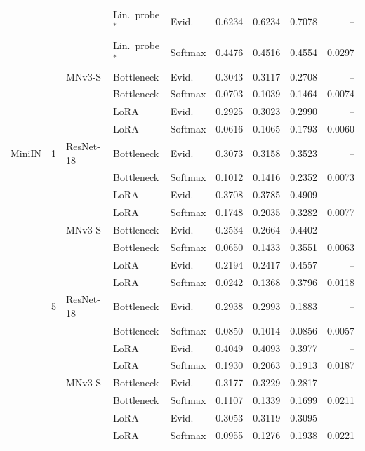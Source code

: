 \begin{longtable}{@{}lllllrrrr@{}}
 &  &  & Lin.\ probe$^\ast$ & Evid. & 0.6234 & 0.6234 & 0.7078 & -- \\
 &  &  & Lin.\ probe$^\ast$ & Softmax & 0.4476 & 0.4516 & 0.4554 & 0.0297 \\
 &  & MNv3-S & Bottleneck & Evid. & 0.3043 & 0.3117 & 0.2708 & -- \\
 &  &  & Bottleneck & Softmax & 0.0703 & 0.1039 & 0.1464 & 0.0074 \\
 &  &  & LoRA & Evid. & 0.2925 & 0.3023 & 0.2990 & -- \\
 &  &  & LoRA & Softmax & 0.0616 & 0.1065 & 0.1793 & 0.0060 \\
MiniIN & 1 & ResNet-18 & Bottleneck & Evid. & 0.3073 & 0.3158 & 0.3523 & -- \\
 &  &  & Bottleneck & Softmax & 0.1012 & 0.1416 & 0.2352 & 0.0073 \\
 &  &  & LoRA & Evid. & 0.3708 & 0.3785 & 0.4909 & -- \\
 &  &  & LoRA & Softmax & 0.1748 & 0.2035 & 0.3282 & 0.0077 \\
 &  & MNv3-S & Bottleneck & Evid. & 0.2534 & 0.2664 & 0.4402 & -- \\
 &  &  & Bottleneck & Softmax & 0.0650 & 0.1433 & 0.3551 & 0.0063 \\
 &  &  & LoRA & Evid. & 0.2194 & 0.2417 & 0.4557 & -- \\
 &  &  & LoRA & Softmax & 0.0242 & 0.1368 & 0.3796 & 0.0118 \\
 & 5 & ResNet-18 & Bottleneck & Evid. & 0.2938 & 0.2993 & 0.1883 & -- \\
 &  &  & Bottleneck & Softmax & 0.0850 & 0.1014 & 0.0856 & 0.0057 \\
 &  &  & LoRA & Evid. & 0.4049 & 0.4093 & 0.3977 & -- \\
 &  &  & LoRA & Softmax & 0.1930 & 0.2063 & 0.1913 & 0.0187 \\
 &  & MNv3-S & Bottleneck & Evid. & 0.3177 & 0.3229 & 0.2817 & -- \\
 &  &  & Bottleneck & Softmax & 0.1107 & 0.1339 & 0.1699 & 0.0211 \\
 &  &  & LoRA & Evid. & 0.3053 & 0.3119 & 0.3095 & -- \\
 &  &  & LoRA & Softmax & 0.0955 & 0.1276 & 0.1938 & 0.0221 \\
\end{longtable}
\endgroup


